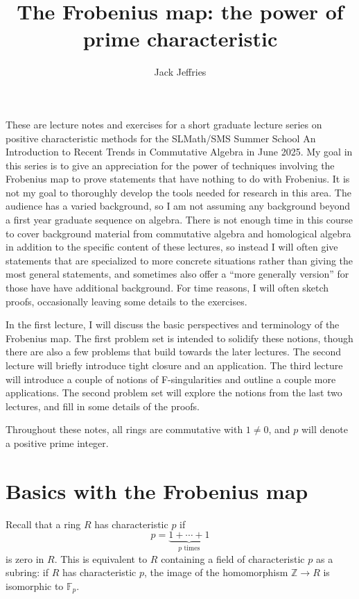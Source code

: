\documentclass[12pt]{amsart}
\theoremstyle{definition}
\numberwithin{equation}{theorem}
\def\FF{\mathbb{F}}
\def\ZZ{\mathbb{Z}}
\def\to{\longrightarrow}
\begin{document}
\title[Prime characteristic]{The Frobenius map: the power of prime characteristic}

\author{Jack Jeffries}
\address{Department of Mathematics, University of Nebraska, 203 Avery Hall, Lincoln, NE-68588, USA}
\maketitle


These are lecture notes and exercises for a short graduate lecture series on positive characteristic methods for the SLMath/SMS Summer School An Introduction to Recent Trends in Commutative Algebra in June 2025. My goal in this series is to give an appreciation for the power of techniques involving the Frobenius map to prove statements that have nothing to do with Frobenius. It is not my goal to thoroughly develop the tools needed for research in this area. The audience has a varied background, so I am not assuming any background beyond a first year graduate sequence on algebra. There is not enough time in this course to cover background material from commutative algebra and homological algebra in addition to the specific content of these lectures, so instead I will often give statements that are specialized to more concrete situations rather than giving the most general statements, and sometimes also offer a ``more generally version'' for those have have additional background. For time reasons, I will often sketch proofs, occasionally leaving some details to the exercises.

In the first lecture, I will discuss the basic perspectives and terminology of the Frobenius map. The first problem set is intended to solidify these notions, though there are also a few problems that build towards the later lectures. The second lecture will briefly introduce tight closure and an application. The third lecture will introduce a couple of notions of F-singularities and outline a couple more applications. The second problem set will explore the notions from the last two lectures, and fill in some details of the proofs.

Throughout these notes, all rings are commutative with $1\neq 0$, and $p$ will denote a positive prime integer.


\section{Basics with the Frobenius map}
Recall that a ring $R$ has characteristic $p$ if \[p= \underbrace{1+ \cdots + 1}_{p\text{ times}}\] is zero in $R$. This is equivalent to $R$ containing a field of characteristic $p$ as a subring: if $R$ has characteristic $p$, the image of the homomorphism $\ZZ \to R$ is isomorphic to $\FF_p$.
\end{document}
